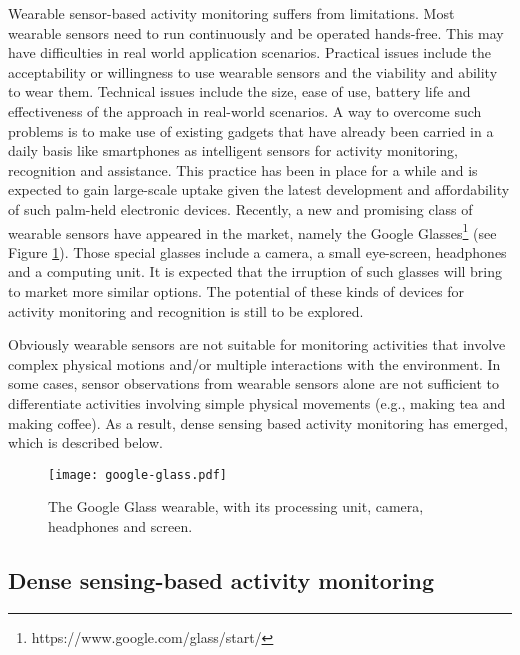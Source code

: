 Wearable sensor-based activity monitoring suffers from limitations. Most wearable sensors need to run continuously and be operated hands-free. This may have difficulties in real world application scenarios. Practical issues include the acceptability or willingness to use wearable sensors and the viability and ability to wear them. Technical issues include the size, ease of use, battery life and effectiveness of the approach in real-world scenarios. A way to overcome such problems is to make use of existing gadgets that have already been carried in a daily basis like smartphones as intelligent sensors for activity monitoring, recognition and assistance. This practice has been in place for a while \cite{Gellersen2002} \cite{Schmidt2001} and is expected to gain large-scale uptake given the latest development and affordability of such palm-held electronic devices. Recently, a new and promising class of wearable sensors have appeared in the market, namely the Google Glasses\footnote{https://www.google.com/glass/start/} (see Figure \ref{fig-google-glass}). Those special glasses include a camera, a small eye-screen, headphones and a computing unit. It is expected that the irruption of such glasses will bring to market more similar options. The potential of these kinds of devices for activity monitoring and recognition is still to be explored. 

Obviously wearable sensors are not suitable for monitoring activities that involve complex physical motions and/or multiple interactions with the environment. In some cases, sensor observations from wearable sensors alone are not sufficient to differentiate activities involving simple physical movements (e.g., making tea and making coffee). As a result, dense sensing based activity monitoring has emerged, which is described below.

\begin{figure}[htbp]
\centering
\texttt{[image: google-glass.pdf]}
    \caption{The Google Glass wearable, with its processing unit, camera, headphones and screen.}
    \label{fig-google-glass}
\end{figure}

\subsection{Dense sensing-based activity monitoring}

